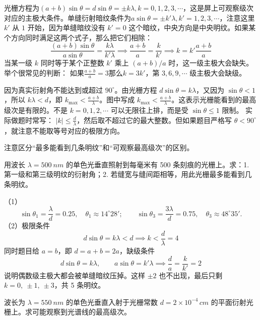 \begin{definition}[缺级现象]
    光栅方程为$(a+b)\sin\theta=d\sin\theta=\pm k\lambda,k=0,1,2,3,\cdots$，这是屏上可观察级次对应的主极大条件。单缝衍射暗纹条件为$a\sin\theta=\pm k'\lambda,k'=1,2,3,\cdots$，注意这里 \(k'\) 从 \(1\) 开始，因为单缝暗纹没有 \(k'=0\) 这个暗纹，中央方向是中央明纹。如果某个方向同时满足这两个式子，那么把它们相除：
\[
\frac{(a+b)\sin\theta}{a\sin\theta}
=
\frac{k\lambda}{k'\lambda}\implies
\frac{a+b}{a}=\frac{k}{k'}\implies
k=k'\frac{a+b}{a}
\]当某一级 \(k\) 同时等于某个正整数 \(k'\) 乘上 \((a+b)/a\) 时，这一级主极大会缺失。举个很常见的判断：
如果$\frac{a+b}{a}=3$那么$k=3k'$，第 \(3,6,9,\cdots\) 级主极大会缺级。
\end{definition}

\begin{theorem}[屏上可观察的最高级次]
因为真实衍射角不能达到或超过 \(90^\circ\)。由光栅方程 \(d\sin\theta=k\lambda\)，又因为 \(\sin\theta<1\)，所以 \(k\lambda<d\)，即 \(k_{\max}<\frac{a+b}{\lambda}\)。图中写成 \(k_{\max}<\frac{a+b}{\lambda}\)。这表示光栅能看到的最高级次是有限的。不是 \(k=0,1,2,\cdots\) 可以无限往上排，而是受 \(\sin\theta\le 1\) 限制。
实际做题时常写：
\(|k|\le \frac{d}{\lambda}\)，然后取不超过它的最大整数。但如果题目严格写 \(\theta<90^\circ\)，就注意不能取等号对应的极限方向。
\end{theorem}
注意区分“最多能看到几条明纹”和“可观察最高级次”的区别。
\begin{exercise}
用波长 \(\lambda=\SI{500}{nm}\) 的单色光垂直照射到每毫米有 500 条刻痕的光栅上。求：1. 第一级和第三级明纹的衍射角；2. 若缝宽与缝间距相等，用此光栅最多能看到几条明纹。
\end{exercise}

\begin{solution}
（1）
 \[\sin\theta_1=\frac{\lambda}{d}=0.25,\quad \theta_1\approx14^\circ 28';\qquad \sin\theta_3=\frac{3\lambda}{d}=0.75,\quad \theta_3\approx48^\circ 35'.\]
 （2）极限条件\[d\sin\theta=k\lambda< d\implies k<\frac{d}{\lambda}=4\]
同时题目给 \(a=b\)，即 \(d=a+b=2a\)，缺级条件
 \[d\sin\theta=k\lambda,\qquad a\sin\theta=k'\lambda \implies \frac{d}{a}=\frac{k}{k'}=2\]
说明偶数级主极大都会被单缝暗纹压掉。这样 \(\pm2\) 也不出现，最后只剩 \(k=0,\ \pm1,\ \pm3\)，共 5 条明纹。
\end{solution}

\begin{exercise}
波长为 \(\lambda=\SI{550}{nm}\) 的单色光垂直入射于光栅常数 \(d=2\times10^{-4}\,\si{cm}\) 的平面衍射光栅上。求可能观察到光谱线的最高级次。
\end{exercise}


